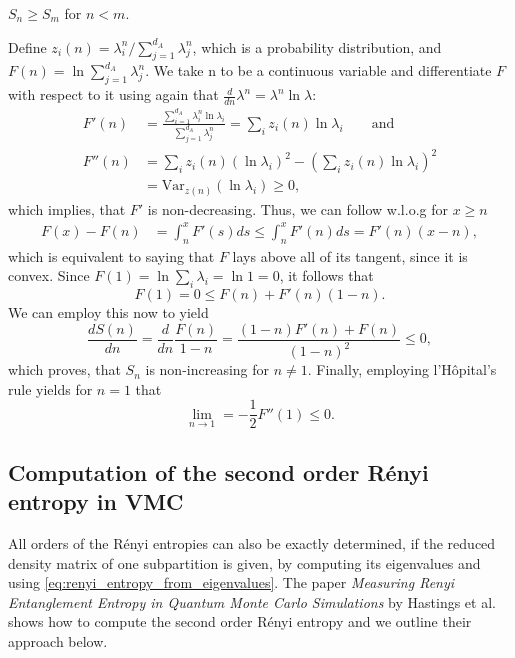 \documentclass[../../main.tex]{subfiles}
\begin{document}
\begin{claim}
      $S_n \geq S_m$ for $n<m$.
\end{claim}
\begin{claimproof}
      Define $z_i(n) = \lambda_i^n / \sum_{j=1}^{d_A} \lambda_j^n$, which is a probability distribution, and $F(n) = \ln \sum_{j=1}^{d_A} \lambda^n_j$. We take n to be a continuous variable and differentiate $F$ with respect to it using again that $\frac{d}{dn} \lambda^n = \lambda^n \ln \lambda $:
      \begin{align*}
            F'(n) &= \frac{\sum_{i=1}^{d_A} \lambda_i^n \ln \lambda_i }{\sum_{j=1}^{d_A} \lambda_j^n} 
            = \sum_i z_i(n) \ln \lambda_i \qquad \text{and} \\
            F''(n) &= \sum_i z_i(n) (\ln \lambda_i)^2 - \left( \sum_i z_i(n) \ln \lambda_i \right)^2 \\
            &= \mathrm{Var}_{z(n)}(\ln \lambda_i) \geq 0 ,
      \end{align*}
      which implies, that $F'$ is non-decreasing. Thus, we can follow w.l.o.g for $x\geq n$
      \begin{align*}
            F(x) - F(n) &= \int_n^x F'(s) ds \leq \int_n^x F'(n) ds = F'(n) (x - n),
      \end{align*}
      which is equivalent to saying that $F$ lays above all of its tangent, since it is convex. Since $F(1) = \ln \sum_i \lambda_i = \ln 1 = 0 $, it follows that
      \begin{equation*}
            F(1) = 0 \leq F(n) + F'(n)(1-n) .
      \end{equation*}
      We can employ this now to yield 
      \begin{equation*}
            \frac{d S(n)}{dn} = \frac{d}{dn} \frac{F(n)}{1-n} = \frac{(1-n) F'(n) + F(n)}{(1-n)^2} \leq 0 ,
      \end{equation*}  
      which proves, that $S_n$ is non-increasing for $n \neq 1$.
      Finally, employing l'Hôpital's rule yields for $n=1$ that
      \begin{equation*}
            \lim_{n\rightarrow1} = - \frac{1}{2} F''(1) \leq 0 .
      \end{equation*}
\end{claimproof}

\subsection{Computation of the second order Rényi entropy in VMC}
\label{subsec:renyi-entropy-vmc}
All orders of the Rényi entropies can also be exactly determined, if the reduced density matrix of one subpartition is given, by computing its eigenvalues and using \cref{eq:renyi_entropy_from_eigenvalues}. The paper \emph{Measuring Renyi Entanglement Entropy in Quantum Monte Carlo Simulations} by Hastings et al. shows how to compute the second order Rényi entropy and we outline their approach below.
\end{document}
